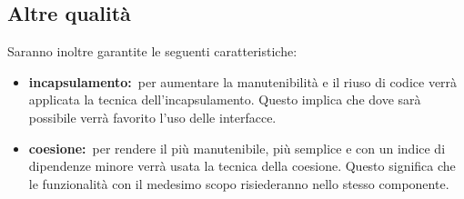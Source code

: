 	\subsection{Altre qualità}
	\label{altreQualita}
		Saranno inoltre garantite le seguenti caratteristiche:
		\begin{itemize}
			\item \textbf{incapsulamento:}\ per aumentare la manutenibilità e il riuso di codice verrà applicata la tecnica dell'incapsulamento. Questo implica che dove sarà possibile verrà favorito l'uso delle interfacce.
			\item \textbf{coesione:}\ per rendere il  più manutenibile, più semplice e con un indice di dipendenze minore verrà usata la tecnica della coesione. Questo significa che le funzionalità con il medesimo scopo risiederanno nello stesso componente.
		\end{itemize}